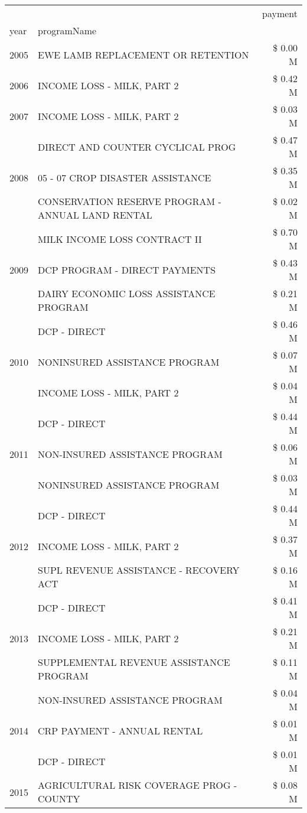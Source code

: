 \begin{tabular}{llr}
\toprule
 &  & payment \\
year & programName &  \\
\midrule
2005 & EWE LAMB REPLACEMENT OR RETENTION & \$ 0.00 M \\
\cline{1-3}
2006 & INCOME LOSS - MILK, PART 2 & \$ 0.42 M \\
\cline{1-3}
2007 & INCOME LOSS - MILK, PART 2 & \$ 0.03 M \\
\cline{1-3}
\multirow[t]{3}{*}{2008} & DIRECT AND COUNTER CYCLICAL PROG & \$ 0.47 M \\
 & 05 - 07 CROP DISASTER ASSISTANCE & \$ 0.35 M \\
 & CONSERVATION RESERVE PROGRAM - ANNUAL LAND RENTAL & \$ 0.02 M \\
\cline{1-3}
\multirow[t]{3}{*}{2009} & MILK INCOME LOSS CONTRACT II & \$ 0.70 M \\
 & DCP PROGRAM - DIRECT PAYMENTS & \$ 0.43 M \\
 & DAIRY ECONOMIC LOSS ASSISTANCE PROGRAM & \$ 0.21 M \\
\cline{1-3}
\multirow[t]{3}{*}{2010} & DCP - DIRECT & \$ 0.46 M \\
 & NONINSURED ASSISTANCE PROGRAM & \$ 0.07 M \\
 & INCOME LOSS - MILK, PART 2 & \$ 0.04 M \\
\cline{1-3}
\multirow[t]{3}{*}{2011} & DCP - DIRECT & \$ 0.44 M \\
 & NON-INSURED ASSISTANCE PROGRAM & \$ 0.06 M \\
 & NONINSURED ASSISTANCE PROGRAM & \$ 0.03 M \\
\cline{1-3}
\multirow[t]{3}{*}{2012} & DCP - DIRECT & \$ 0.44 M \\
 & INCOME LOSS - MILK, PART 2 & \$ 0.37 M \\
 & SUPL REVENUE ASSISTANCE - RECOVERY ACT & \$ 0.16 M \\
\cline{1-3}
\multirow[t]{3}{*}{2013} & DCP - DIRECT & \$ 0.41 M \\
 & INCOME LOSS - MILK, PART 2 & \$ 0.21 M \\
 & SUPPLEMENTAL REVENUE ASSISTANCE PROGRAM & \$ 0.11 M \\
\cline{1-3}
\multirow[t]{3}{*}{2014} & NON-INSURED ASSISTANCE PROGRAM & \$ 0.04 M \\
 & CRP PAYMENT - ANNUAL RENTAL & \$ 0.01 M \\
 & DCP - DIRECT & \$ 0.01 M \\
\cline{1-3}
\multirow[t]{3}{*}{2015} & AGRICULTURAL RISK COVERAGE PROG - COUNTY & \$ 0.08 M \\

\end{tabular}
